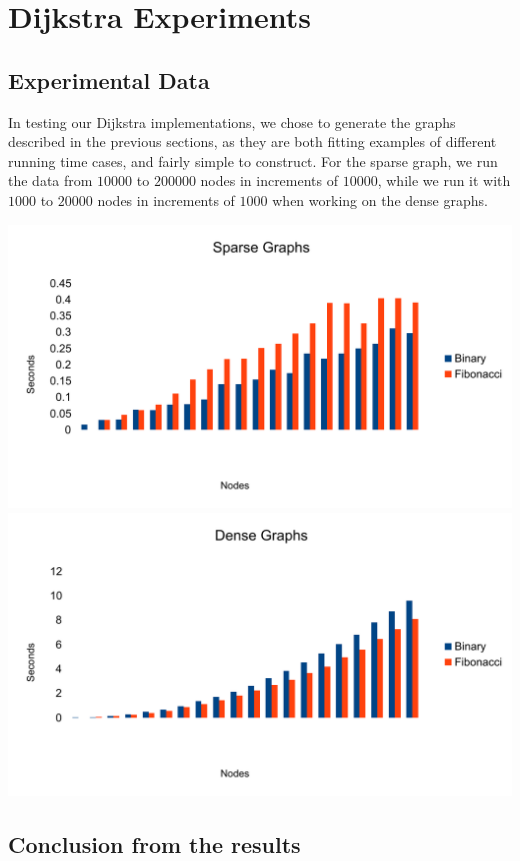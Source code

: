 \section{Dijkstra Experiments}

\subsection{Experimental Data}

In testing our Dijkstra implementations, we chose to generate the graphs described in the previous sections, as they are both fitting examples of different running time cases, and fairly simple to construct.
For the sparse graph, we run the data from $10000$ to $200000$ nodes in increments of $10000$, while we run it with $1000$ to $20000$ nodes in increments of $1000$ when working on the dense graphs.

\includegraphics[width=\textwidth]{graphs/sparse}
\includegraphics[width=\textwidth]{graphs/dense}

\subsection{Conclusion from the results}


